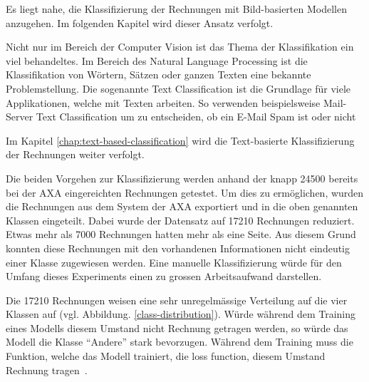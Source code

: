 
Es liegt nahe, die Klassifizierung der Rechnungen mit Bild-basierten Modellen anzugehen. Im folgenden Kapitel wird dieser Ansatz verfolgt.

Nicht nur im Bereich der Computer Vision ist das Thema der Klassifikation ein viel behandeltes. Im Bereich des Natural Language Processing ist die Klassifikation von Wörtern, Sätzen oder ganzen Texten eine bekannte Problemstellung. Die sogenannte Text Classification ist die Grundlage für viele Applikationen, welche mit Texten arbeiten. So verwenden beispielsweise Mail-Server Text Classification um zu entscheiden, ob ein E-Mail Spam ist oder nicht~\autocite{https://developers.google.com/machine-learning/guides/text-classification/}

Im Kapitel \autoref{chap:text-based-classification} wird die Text-basierte Klassifizierung der Rechnungen weiter verfolgt.

Die beiden Vorgehen zur Klassifizierung werden anhand der knapp 24500 bereits bei der AXA eingereichten Rechnungen getestet. Um dies zu ermöglichen, wurden die Rechnungen aus dem System der AXA exportiert und in die oben genannten Klassen eingeteilt. Dabei wurde der Datensatz auf 17210 Rechnungen reduziert. Etwas mehr als 7000 Rechnungen hatten mehr als eine Seite. Aus diesem Grund konnten diese Rechnungen mit den vorhandenen Informationen nicht eindeutig einer Klasse zugewiesen werden. Eine manuelle Klassifizierung würde für den Umfang dieses Experiments einen zu grossen Arbeitsaufwand darstellen.

Die 17210 Rechnungen weisen eine sehr unregelmässige Verteilung auf die vier Klassen auf (vgl. Abbildung. \ref{class-distribution}). Würde während dem Training eines Modells diesem Umstand nicht Rechnung getragen werden, so würde das Modell die Klasse \enquote{Andere} stark bevorzugen. Während dem Training muss die Funktion, welche das Modell trainiert, die loss function, diesem Umstand Rechnung tragen~\autocite{TODO TODO TODO}.


